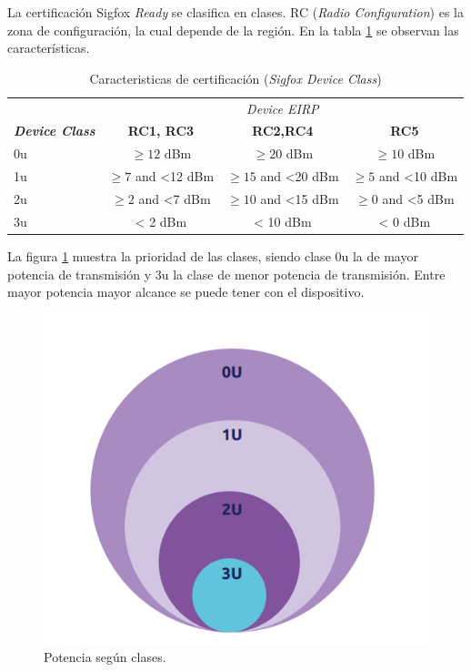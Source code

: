 La certificación Sigfox \textit{Ready} se clasifica en clases. RC (\textit{Radio Configuration}) es la zona de configuración, la cual depende de la región. En la tabla \ref{tab:ZonasSigfox} se observan las características\citep{CertificationSigfox}.
\begin{table}[h]
	\centering
	\caption[Sigfox \textit{Ready}]{Caracteristicas de certificación (\textit{Sigfox Device Class}) }
	\begin{tabular}{l c c c}    
		\toprule
		\textbf{  } & \multicolumn{3}{c}{\textit{Device EIRP}} \\ \cline{2-4} 
		\textbf{ \textit{Device Class} } & \textbf{RC1, RC3} & \textbf{RC2,RC4} 	& \textbf{RC5} \\
		\midrule
		0u	    &$\ge12$ dBm 	&$\ge20$ dBm & $\ge10$ dBm \\	
		1u	&$\ge7$ and <12 dBm &$\ge15$ and <20 dBm & $\ge5$ and <10 dBm\\
		2u	&$\ge2$ and <7 dBm & $\ge10$ and <15 dBm & $\ge0$ and <5 dBm \\	
		3u	&< 2 dBm &< 10 dBm &< 0 dBm   \\
		\bottomrule
		\hline
	\end{tabular}
	\label{tab:ZonasSigfox}
\end{table}

La figura \ref{fig:certificacion} muestra la prioridad de las clases, siendo clase 0u la de mayor potencia de transmisión y 3u la clase de menor potencia de transmisión. Entre mayor potencia mayor alcance se puede tener con el dispositivo\citep{CertificationSigfox}.
\begin{figure}[h]
	\centering
	\includegraphics[scale=.65]{./Figures/certificacion.PNG}
	\caption{Potencia según clases.}
	\label{fig:certificacion}
\end{figure}


